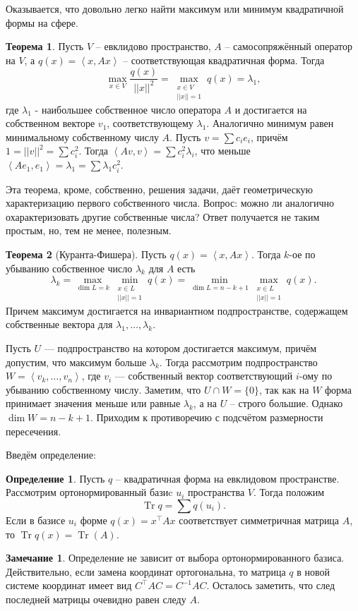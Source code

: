 \documentclass[10pt,a4paper,oneside]{book}
\theoremstyle{definition}
\newtheorem*{rem}{Замечание}
\newtheorem*{defn}{Определение}
\newtheorem{thm}{Теорема}
\newcommand{\Tr}{\operatorname{Tr}}
\def\lan{\left\langle }
\def\ran{\right\rangle}
\def\thrm{\begin{thm}}
\def\ethrm{\end{thm}}
\def\dfn{\begin{defn}}
\def\edfn{\end{defn}}
\def\rm{\begin{rem}}
\def\erm{\end{rem}}
\begin{document}
Оказывается, что довольно легко найти максимум или минимум квадратичной формы на сфере.



\thrm Пусть $V$ -- евклидово пространство, $A$ -- самосопряжённый оператор на $V$, а $q(x)=\lan x,Ax\ran$ -- соответствующая квадратичная форма. Тогда 
$$\max_{ x\in V } \frac{q(x)}{||x||^2}=\max_{\substack{ x\in V \\ ||x||=1}} q(x)=\lambda_1,$$
 где $\lambda_1$ - наибольшее собственное число оператора $A$ и достигается на собственном векторе $v_1$, соответствующему $\lambda_1$. Аналогично минимум равен минимальному собственному числу $A$. 
\proof
Пусть $v=\sum c_i e_i$, причём $1=||v||^2=\sum c_i^2$. Тогда $\lan Av,v\ran = \sum c^2_i \lambda_i $, что меньше $\lan A e_1,e_1\ran= \lambda_1= \sum \lambda_1 c_i^2$.
\endproof
\ethrm

Эта теорема, кроме, собственно, решения задачи, даёт геометрическую характеризацию первого собственного числа. Вопрос: можно ли аналогично охарактеризовать другие собственные числа? Ответ получается не таким простым, но, тем не менее, полезным.

\thrm[Куранта-Фишера] Пусть $q(x)=\lan x, Ax\ran$. Тогда $k$-ое по убыванию собственное число $\lambda_k$ для $A$ есть 
$$ \lambda_k=\max_{\dim L=k} \min_{\substack{ x\in L \\ ||x||=1}} q(x) = \min_{\dim L=n-k+1} \max_{\substack{ x\in L \\ ||x||=1}} q(x).$$
Причем максимум достигается на инвариантном подпространстве, содержащем собственные вектора для $\lambda_1,\dots,\lambda_k$.
\ethrm
\proof Пусть $U$ --- подпространство на котором достигается максимум, причём допустим, что максимум больше $\lambda_k$. Тогда рассмотрим подпространство $W=\lan v_k,\dots,v_n\ran$, где $v_i$ --- собственный вектор соответствующий $i$-ому по убыванию собственному числу. Заметим, что $U\cap W=\{0\}$, так как на $W$ форма принимает значения меньше или равные $\lambda_k$, а на $U$ -- строго большие. Однако $\dim W=n-k+1$. Приходим к противоречию с подсчётом размерности пересечения. 
\endproof


Введём определение:
\dfn
Пусть $q$ -- квадратичная форма на евклидовом пространстве. Рассмотрим ортонормированный базиc $u_i$ пространства $V$. Тогда положим 
$$\Tr q= \sum q(u_i).$$ Если в базисе $u_i$ форме $q(x)=x^{\top} Ax $ соответствует симметричная матрица $A$, то $\Tr q(x)=\Tr(A)$.
\edfn

\rm Определение не зависит от выбора ортонормированного базиса. Действительно, если замена координат ортогональна, то матрица $q$ в новой системе координат имеет вид $C^{\top}AC=C^{-1}AC$. Осталось заметить, что след последней матрицы очевидно равен следу $A$.
\erm
\end{document}

